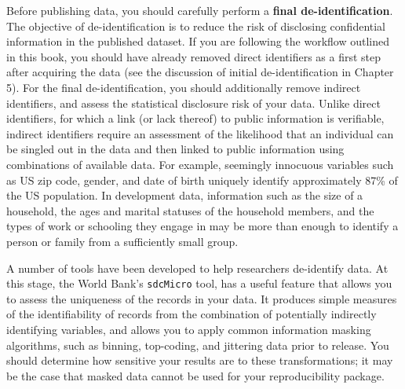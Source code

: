 Before publishing data,
you should carefully perform a \textbf{final de-identification}.
The objective of de-identification is to reduce the risk of disclosing confidential information in the published dataset.
If you are following the workflow outlined in this book,
you should have already removed direct identifiers as a first step after acquiring the data
(see the discussion of initial de-identification in Chapter 5).
For the final de-identification, you should additionally remove
indirect identifiers, and assess the statistical disclosure risk of your data.
Unlike direct identifiers, for which a link (or lack thereof) to public information is verifiable,
indirect identifiers require an assessment of the likelihood
that an individual can be singled out in the data
and then linked to public information using combinations of available data.
For example, seemingly innocuous variables such as US zip code,
gender, and date of birth uniquely identify
approximately 87\% of the US population.
In development data, information such as the size of a household,
the ages and marital statuses of the household members,
and the types of work or schooling they engage in
may be more than enough to identify a person or family
from a sufficiently small group.

A number of tools have been developed to help researchers de-identify data.
At this stage, the World Bank's \texttt{sdcMicro} tool,
has a useful feature
that allows you to assess the uniqueness of the records in your data.
It produces simple measures of the identifiability of records from
the combination of potentially indirectly identifying variables,
and allows you to apply common information masking algorithms,
such as binning, top-coding, and jittering data prior to release.
You should determine how sensitive your results are to these transformations;
it may be the case that masked data cannot be used for your reproducibility package.

